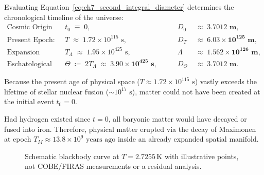 \documentclass[
    12pt,
    a4paper,
    headings=normal,
    twoside=false,
    open=any,
    parskip=half
]{scrbook}
\begin{document}
\begin{phystheorem}\label{thm:ch7_aeon_milestones_master}
Evaluating Equation~\eqref{eq:ch7_second_integral_diameter} determines the chronological timeline of the universe:
\begin{equation}
\begin{aligned}
\text{Cosmic Origin (Sphere Trinity):} \quad &t_0 \;\equiv\; 0, \qquad &D_0 &\;\approx\; \mathbf{3.7012 \text{ m}}, \\
\text{Present Epoch:} \quad &T \;\approx\; 1.72 \times 10^{115} \text{ s}, \qquad &D_T &\;\approx\; \mathbf{6.03 \times 10^{125} \text{ m}}, \\
\text{Expansion Apex:} \quad &T_\Lambda \;\approx\; 1.95 \times 10^{425} \text{ s}, \qquad &\Lambda &\;\approx\; \mathbf{1.562 \times 10^{126} \text{ m}}, \\
\text{Eschatological Closure:} \quad &\Theta \;\coloneqq\; 2 T_\Lambda \;\approx\; \mathbf{3.90 \times 10^{425} \text{ s}}, \qquad &D_\Theta &\;\approx\; \mathbf{3.7012 \text{ m}}.
\end{aligned}
\label{eq:ch7_aeon_milestones_clean}
\end{equation}
\end{phystheorem}

\begin{physscholion}
Because the present age of physical space ($T \approx 1.72 \times 10^{115}\text{ s}$) vastly exceeds the lifetime of stellar nuclear fusion ($\sim 10^{17}\text{ s}$), matter could not have been created at the initial event $t_0 = 0$. 

Had hydrogen existed since $t = 0$, all baryonic matter would have decayed or fused into iron. Therefore, physical matter erupted via the decay of Maximonen at epoch $T_M \approx 13.8 \times 10^9\text{ years ago}$ inside an already expanded spatial manifold.
\end{physscholion}
\begin{figure}[htbp]\centering
{}
\caption{Schematic blackbody curve at $T=2.7255\,\mathrm{K}$ with illustrative points, not COBE/FIRAS measurements or a residual analysis.}\label{fig:ch7_cobe_firas_blackbody_thermalization}\end{figure}
\end{document}
